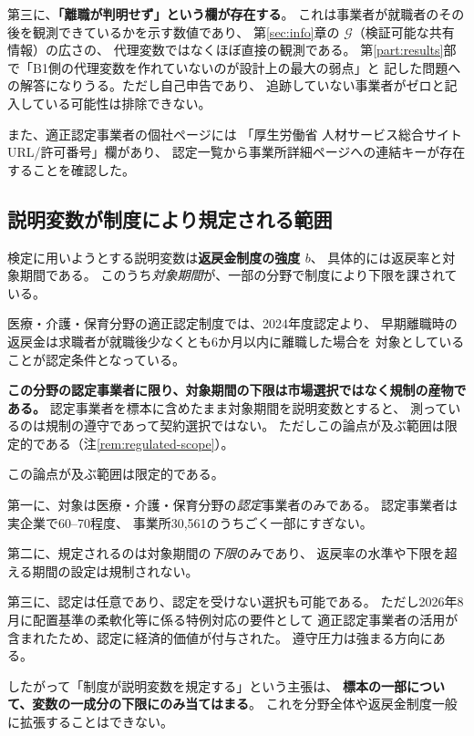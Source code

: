 第三に、\textbf{「離職が判明せず」という欄が存在する}。
これは事業者が就職者のその後を観測できているかを示す数値であり、
第\ref{sec:info}章の $\mathcal{G}$（検証可能な共有情報）の広さの、
代理変数ではなくほぼ直接の観測である。
第\ref{part:results}部で「B1側の代理変数を作れていないのが設計上の最大の弱点」と
記した問題への解答になりうる。ただし自己申告であり、
追跡していない事業者がゼロと記入している可能性は排除できない。

また、適正認定事業者の個社ページには
「厚生労働省 人材サービス総合サイトURL/許可番号」欄があり、
認定一覧から事業所詳細ページへの連結キーが存在することを確認した。

\subsection{説明変数が制度により規定される範囲}
\label{sec:regulated-regressor}

検定に用いようとする説明変数は\textbf{返戻金制度の強度 $b$}、
具体的には返戻率と対象期間である。
このうち\emph{対象期間}が、一部の分野で制度により下限を課されている。

医療・介護・保育分野の適正認定制度では、2024年度認定より、
早期離職時の返戻金は求職者が就職後少なくとも6か月以内に離職した場合を
対象としていることが認定条件となっている。

\textbf{この分野の認定事業者に限り、対象期間の下限は市場選択ではなく規制の産物である。}
認定事業者を標本に含めたまま対象期間を説明変数とすると、
測っているのは規制の遵守であって契約選択ではない。
ただしこの論点が及ぶ範囲は限定的である（注\ref{rem:regulated-scope}）。

\begin{remark}[適用範囲の限定]
\label{rem:regulated-scope}
この論点が及ぶ範囲は限定的である。

第一に、対象は医療・介護・保育分野の\emph{認定}事業者のみである。
認定事業者は実企業で60--70程度、
事業所30,561のうちごく一部にすぎない。

第二に、規定されるのは対象期間の\emph{下限}のみであり、
返戻率の水準や下限を超える期間の設定は規制されない。

第三に、認定は任意であり、認定を受けない選択も可能である。
ただし2026年8月に配置基準の柔軟化等に係る特例対応の要件として
適正認定事業者の活用が含まれたため、認定に経済的価値が付与された。
遵守圧力は強まる方向にある。

したがって「制度が説明変数を規定する」という主張は、
\textbf{標本の一部について、変数の一成分の下限にのみ当てはまる}。
これを分野全体や返戻金制度一般に拡張することはできない。
\end{remark}

